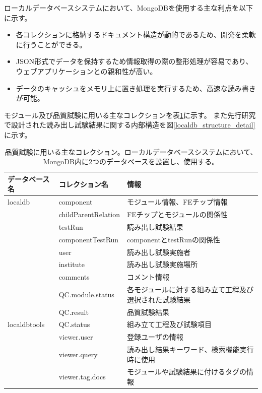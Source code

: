 ローカルデータベースシステムにおいて、MongoDBを使用する主な利点を以下に示す。

\begin{itemize}
  \item 各コレクションに格納するドキュメント構造が動的であるため、開発を柔軟に行うことができる。
  \item JSON形式でデータを保持するため情報取得の際の整形処理が容易であり、ウェブアプリケーションとの親和性が高い。
  \item データのキャッシュをメモリ上に置き処理を実行するため、高速な読み書きが可能\cite{4-8}。
\end{itemize}

モジュール及び品質試験に用いる主なコレクションを表\ref{localdb_structure}に示す。
また先行研究で設計された読み出し試験結果に関する内部構造を図\ref{localdb_structure_detail}に示す。

\begin{table}[btp]
\begin{center}
\caption[品質試験に用いる主なコレクション]{品質試験に用いる主なコレクション。ローカルデータベースシステムにおいて、MongoDB内に2つのデータベースを設置し、使用する。}
\label{localdb_structure}
  \small
  \begin{tabular}{|lll|} \hline
    データベース名 & コレクション名 & 情報 \\ \hline
    localdb      & component & モジュール情報、FEチップ情報 \\ 
                 & childParentRelation & FEチップとモジュールの関係性 \\ 
                 & testRun & 読み出し試験結果 \\ 
                 & componentTestRun & componentとtestRunの関係性 \\
                 & user & 読み出し試験実施者 \\
                 & institute & 読み出し試験実施場所 \\
                 & comments & コメント情報 \\
                 & QC.module.status & 各モジュールに対する組み立て工程及び選択された試験結果 \\ 
                 & QC.result & 品質試験結果 \\ \hline 
    localdbtools & QC.status & 組み立て工程及び試験項目\\
                 & viewer.user & 登録ユーザの情報 \\
                 & viewer.query & 読み出し結果キーワード、検索機能実行時に使用 \\ 
                 & viewer.tag.docs & モジュールや試験結果に付けるタグの情報 \\ \hline
  \end{tabular}
\end{center}
\end{table}

